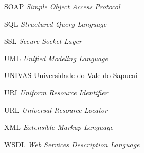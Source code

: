 \begin{SingleSpace}
\begin{siglas}
		\item[SOAP] \textit{Simple Object Access Protocol}
		\item[SQL] \textit{Structured Query Language}
		\item[SSL] \textit{Secure Socket Layer}
		\item[UML] \textit{Unified Modeling Language}
		\item[UNIVAS] Universidade do Vale do Sapucaí
		\item[URI] \textit{Uniform Resource Identifier }
		\item[URL] \textit{Universal Resource Locator}
		\item[XML] \textit{Extensible Markup Language}
		\item[WSDL] \textit{Web Services Description Language}

			
	\end{siglas}

\end{SingleSpace}
